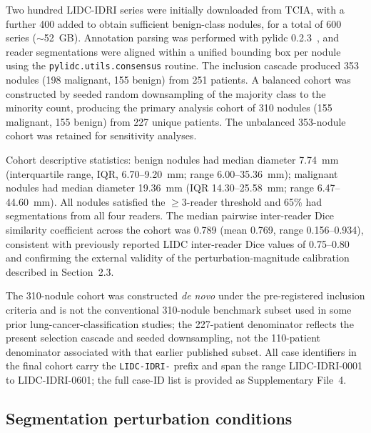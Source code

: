 Two hundred LIDC-IDRI series were initially downloaded from TCIA, with a further 400 added to obtain sufficient benign-class nodules, for a total of 600 series ($\sim$52~GB). Annotation parsing was performed with pylidc 0.2.3~\cite{hancock2016pylidc}, and reader segmentations were aligned within a unified bounding box per nodule using the \texttt{pylidc.utils.consensus} routine. The inclusion cascade produced 353 nodules (198 malignant, 155 benign) from 251 patients. A balanced cohort was constructed by seeded random downsampling of the majority class to the minority count, producing the primary analysis cohort of 310 nodules (155 malignant, 155 benign) from 227 unique patients. The unbalanced 353-nodule cohort was retained for sensitivity analyses.

Cohort descriptive statistics: benign nodules had median diameter 7.74~mm (interquartile range, IQR, 6.70--9.20~mm; range 6.00--35.36~mm); malignant nodules had median diameter 19.36~mm (IQR 14.30--25.58~mm; range 6.47--44.60~mm). All nodules satisfied the $\geq 3$-reader threshold and 65\% had segmentations from all four readers. The median pairwise inter-reader Dice similarity coefficient across the cohort was 0.789 (mean 0.769, range 0.156--0.934), consistent with previously reported LIDC inter-reader Dice values of 0.75--0.80~\cite{kalpathycramer2016} and confirming the external validity of the perturbation-magnitude calibration described in Section~2.3.

The 310-nodule cohort was constructed \emph{de novo} under the pre-registered inclusion criteria and is not the conventional 310-nodule benchmark subset used in some prior lung-cancer-classification studies; the 227-patient denominator reflects the present selection cascade and seeded downsampling, not the 110-patient denominator associated with that earlier published subset. All case identifiers in the final cohort carry the \texttt{LIDC-IDRI-} prefix and span the range LIDC-IDRI-0001 to LIDC-IDRI-0601; the full case-ID list is provided as Supplementary File~4.

\subsection{Segmentation perturbation conditions}

